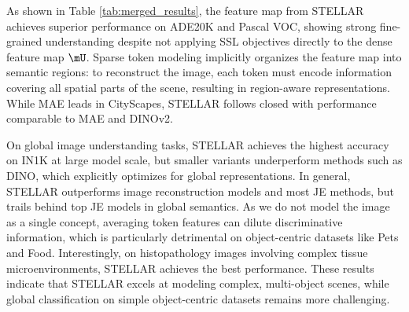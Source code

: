 As shown in Table \ref{tab:merged_results}, the feature map from STELLAR achieves superior performance on ADE20K and Pascal VOC, showing strong fine-grained understanding despite not applying SSL objectives directly to the dense feature map $\mU$. Sparse token modeling implicitly organizes the feature map into semantic regions: to reconstruct the image, each token must encode information covering all spatial parts of the scene, resulting in region-aware representations. While MAE leads in CityScapes, STELLAR follows closed with performance comparable to MAE and DINOv2. 



On global image understanding tasks, STELLAR achieves the highest accuracy on IN1K at large model scale, but smaller variants underperform methods such as DINO, which explicitly optimizes for global representations. In general, STELLAR outperforms image reconstruction models and most JE methods, but trails behind top JE models in global semantics. As we do not model the image as a single concept, averaging token features can dilute discriminative information, which is particularly detrimental on object-centric datasets like Pets and Food. Interestingly, on histopathology images involving complex tissue microenvironments, STELLAR achieves the best performance. These results indicate that STELLAR excels at modeling complex, multi-object scenes, while global classification on simple object-centric datasets remains more challenging.



